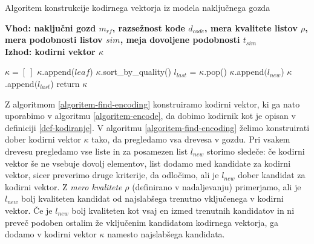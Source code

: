 \documentclass[12pt,a4paper,twoside]{article}
\theoremstyle{definition} %
\theoremstyle{plain} %
\numberwithin{equation}{section}  %
\begin{document}
\begin{algorithm}[h!]
  \caption{Algoritem konstrukcije kodirnega vektorja iz modela naključnega gozda}
  \label{algoritem-find-encoding}
  \raggedright
  \textbf{Vhod: naključni gozd $m_{rf}$, razsežnost kode $d_{code}$, mera kvalitete listov $\rho$, mera podobnosti listov $sim$, meja dovoljene podobnosti $t_{sim}$}  \\
  \textbf{Izhod: kodirni vektor $\kappa$}
  \begin{algorithmic}[0]
	\State $\kappa = [\ ]$
				\State $\kappa$.append($leaf$)
			\EndIf
		\EndFor
	\EndFor
				\State $\kappa$.sort\_by\_quality()
				\State $l_{last}$ = $\kappa$.pop()
						\State $\kappa$.append$(l_{new}$)
					\Else
						\State $\kappa$.append$(l_{last}$)
					\EndIf
				\EndIf
			\EndIf
		\EndFor
	\EndFor	
	\State return $\kappa$
  \end{algorithmic}
\end{algorithm}

Z algoritmom \ref{algoritem-find-encoding} konstruiramo kodirni vektor, ki ga nato uporabimo v algoritmu \ref{algoritem-encode}, 
da dobimo kodirnik kot je opisan v definiciji \ref{def-kodiranje}.
V algoritmu \ref{algoritem-find-encoding} želimo konstruirati dober kodirni vektor $\kappa$ tako, da pregledamo vsa drevesa v gozdu. 
Pri vsakem drevesu pregledamo vse liste in za posamezen list $l_{new}$ storimo sledeče: 
če kodirni vektor še ne vsebuje dovolj elementov, list dodamo med kandidate za kodirni vektor, sicer preverimo druge kriterije, da odločimo, ali je $l_{new}$ dober kandidat za kodirni vektor. 
Z \emph{mero kvalitete} $\rho$ (definirano v nadaljevanju) primerjamo, ali je $l_{new}$ bolj kvaliteten kandidat od najslabšega trenutno vključenega v kodirni vektor. 
Če je $l_{new}$ bolj kvaliteten kot vsaj en izmed trenutnih kandidatov in ni preveč podoben ostalim že vključenim kandidatom kodirnega vektorja, ga dodamo v kodirni vektor $\kappa$ namesto najslabšega kandidata.

\end{document}
